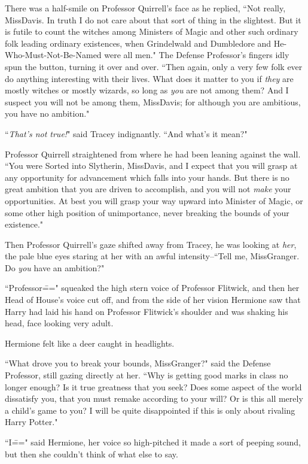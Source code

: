 There was a half-smile on Professor Quirrell's face as he replied, ``Not really, Miss\?Davis. In truth I do not care about that sort of thing in the slightest. But it is futile to count the witches among Ministers of Magic and other such ordinary folk leading ordinary existences, when Grindelwald and Dumbledore and He-Who-Must-Not-Be-Named were all men." The Defense Professor's fingers idly spun the button, turning it over and over. ``Then again, only a very few folk ever do anything interesting with their lives. What does it matter to you if \emph{they} are mostly witches or mostly wizards, so long as \emph{you} are not among them? And I suspect you will not be among them, Miss\?Davis; for although you are ambitious, you have no ambition."

``\emph{That's not true!}" said Tracey indignantly. ``And what's it mean?"

Professor Quirrell straightened from where he had been leaning against the wall. ``You were Sorted into Slytherin, Miss\?Davis, and I expect that you will grasp at any opportunity for advancement which falls into your hands. But there is no great ambition that you are driven to accomplish, and you will not \emph{make} your opportunities. At best you will grasp your way upward into Minister of Magic, or some other high position of unimportance, never breaking the bounds of your existence."

Then Professor Quirrell's gaze shifted away from Tracey, he was looking at \emph{her}, the pale blue eyes staring at her with an awful intensity\---``Tell me, Miss\?Granger. Do \emph{you} have an ambition?"

``Professor\===" squeaked the high stern voice of Professor Flitwick, and then her Head of House's voice cut off, and from the side of her vision Hermione saw that Harry had laid his hand on Professor Flitwick's shoulder and was shaking his head, face looking very adult.

Hermione felt like a deer caught in headlights.

``What drove you to break your bounds, Miss\?Granger?" said the Defense Professor, still gazing directly at her. ``Why is getting good marks in class no longer enough? Is it true greatness that you seek? Does some aspect of the world dissatisfy you, that you must remake according to your will? Or is this all merely a child's game to you? I will be quite disappointed if this is only about rivaling Harry Potter."

``I\===" said Hermione, her voice so high-pitched it made a sort of peeping sound, but then she couldn't think of what else to say.

